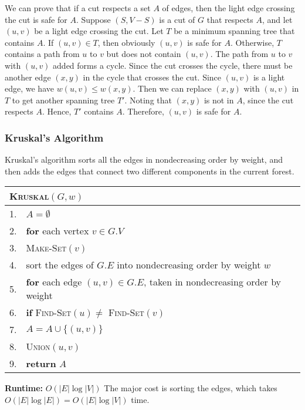 \documentclass[a4paper,12pt]{article}
\begin{document}
We can prove that if a cut respects a set $A$ of edges, then the light edge crossing the cut is safe for $A$.
Suppose $(S, V - S)$ is a cut of $G$ that respects $A$, and let $(u, v)$ be a light edge crossing the cut.
Let $T$ be a minimum spanning tree that contains $A$.
If $(u, v) \in T$, then obviously $(u, v)$ is safe for $A$.
Otherwise, $T$ contains a path from $u$ to $v$ but does not contain $(u, v)$.
The path from $u$ to $v$ with $(u, v)$ added forms a cycle.
Since the cut crosses the cycle, there must be another edge $(x, y)$ in the cycle that crosses the cut.
Since $(u, v)$ is a light edge, we have $w(u, v) \leq w(x, y)$.
Then we can replace $(x, y)$ with $(u, v)$ in $T$ to get another spanning tree $T'$.
Noting that $(x, y)$ is not in $A$, since the cut respects $A$.
Hence, $T'$ contains $A$.
Therefore, $(u, v)$ is safe for $A$.

\subsubsection{Kruskal's Algorithm}

Kruskal's algorithm sorts all the edges in nondecreasing order by weight, and then adds the edges that connect two different components in the current forest.

\begin{center}
	\begin{tabular}{rl}
		\toprule
		\multicolumn{2}{l}{\textsc{Kruskal}$(G, w)$} \\
		\midrule
		1. & $A = \emptyset$ \\
		2. & \textbf{for} each vertex $v \in G.V$ \\
		3. & \quad \textsc{Make-Set}$(v)$ \\
		4. & sort the edges of $G.E$ into nondecreasing order by weight $w$ \\
		5. & \textbf{for} each edge $(u, v) \in G.E$, taken in nondecreasing order by weight \\
		6. & \quad \textbf{if} \textsc{Find-Set}$(u) \neq$ \textsc{Find-Set}$(v)$ \\
		7. & \quad \quad $A = A \cup \{(u, v)\}$ \\
		8. & \quad \quad \textsc{Union}$(u, v)$ \\
		9. & \textbf{return} $A$ \\
		\bottomrule
	\end{tabular}
\end{center}

\textbf{Runtime:}
$O(|E| \log |V|)$
The major cost is sorting the edges, which takes $O(|E| \log |E|) = O(|E| \log |V|)$ time.
\end{document}
